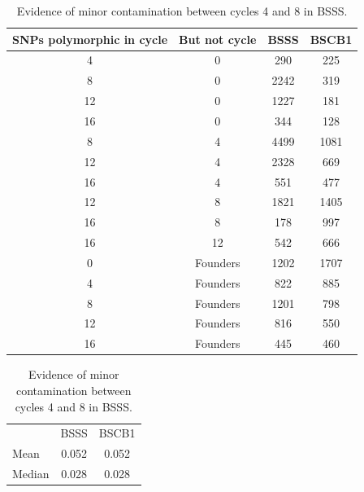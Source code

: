 \clearpage

\begin{table}
\caption{Evidence of minor contamination between cycles 4 and 8 in BSSS.}
\centering
{}
\begin{tabular}{ cccc }
	{SNPs polymorphic in cycle} & {But not cycle} & {BSSS} & {BSCB1} \\ \hline
	4 & 0 & 290 & 225 \\ 
	8 & 0 & 2242 & 319 \\
	12 & 0 & 1227 & 181 \\ 
	16 & 0 & 344 & 128 \\ 
	8 & 4 & 4499 & 1081 \\ 
	12 & 4 & 2328 & 669 \\ 
	16 & 4 & 551 & 477 \\ 
	12 & 8 & 1821 & 1405 \\ 
	16 & 8 & 178 & 997 \\ 
	16 & 12 & 542 & 666 \\ 
	0 & Founders & 1202 & 1707 \\ 
	4 & Founders & 822 & 885 \\ 
	8 & Founders & 1201 & 798 \\ 
	12 & Founders & 816 & 550 \\ 
	16 & Founders & 445 & 460 \\ \hline
\end{tabular}
\bigskip
{}
\begin{tabular}{  lcc }
\multicolumn{1}{l}{} & \multicolumn{1}{l}{BSSS} & \multicolumn{1}{l}{BSCB1}   \\ \cline{2-3}
	Mean & 0.052 & 0.052   \\ 
	Median & 0.028 & 0.028   \\ 
\end{tabular}
		    \label{tab:contamination}  %
\end{table}